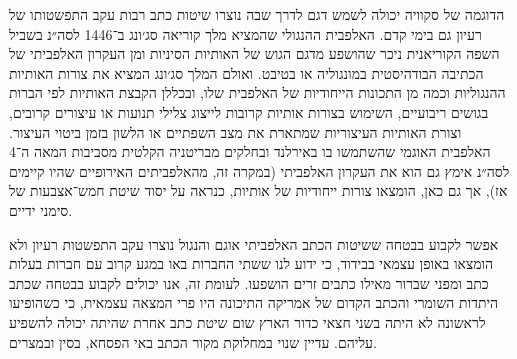 הדוגמה של סקוויה יכולה לשמש דגם לדרך שבה נוצרו שיטות כתב רבות עקב התפשטותו של רעיון גם בימי קדם. האלפבית ההנגולי שהמציא מלך קוריאה סג׳ונג ב־1446 לסה״נ בשביל השפה הקוריאנית ניכר שהושפע מדגם הגוש של האותיות הסיניות ומן העקרון האלפביתי של הכתיבה הבודהיסטית במונגוליה או בטיבט. ואולם המלך סג׳ונג המציא את צורות האותיות ההנגוליות וכמה מן התכונות הייחודיות של האלפבית שלו, ובכללן הקבצת האותיות לפי הברות בגושים ריבועיים, השימוש בצורות אותיות קרובות לייצוג צלילי תנועות או עיצורים קרובים, וצורת האותיות העיצוריות שמתארת את מצב השפתיים או הלשון בזמן ביטוי העיצור. האלפבית האוגמי שהשתמשו בו באירלנד ובחלקים מבריטניה הקלטית מסביבות המאה ה־4 לסה״נ אימץ גם הוא את העקרון האלפביתי (במקרה זה, מהאלפביתים האירופיים שהיו קיימים אז), אך גם כאן, הומצאו צורות ייחודיות של אותיות, כנראה על יסוד שיטת חמש־אצבעות של סימני ידיים.

אפשר לקבוע בבטחה ששיטות הכתב האלפביתי אוגם והנגול נוצרו עקב התפשטות רעיון ולא הומצאו באופן עצמאי בבידוד, כי ידוע לנו ששתי החברות באו במגע קרוב עם חברות בעלות כתב ומפני שברור מאילו כתבים זרים הושפעו. לעומת זה, אנו יכולים לקבוע בבטחה שכתב היתדות השומרי והכתב הקדום של אמריקה התיכונה היו פרי המצאה עצמאית, כי כשהופיעו לראשונה לא היתה בשני חצאי כדור הארץ שום שיטת כתב אחרת שהיתה יכולה להשפיע עליהם. עדיין שנוי במחלוקת מקור הכתב באי הפסחא, בסין ובמצרים.
